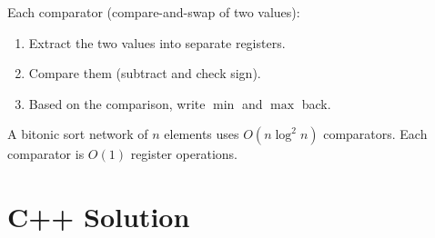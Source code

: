 \documentclass[11pt,a4paper]{article}
\begin{document}
Each comparator (compare-and-swap of two values):
\begin{enumerate}
  \item Extract the two values into separate registers.
  \item Compare them (subtract and check sign).
  \item Based on the comparison, write $\min$ and $\max$ back.
\end{enumerate}

A bitonic sort network of $n$ elements uses $O(n \log^2 n)$ comparators. Each comparator is $O(1)$ register operations.

\section{C++ Solution}
\end{document}
